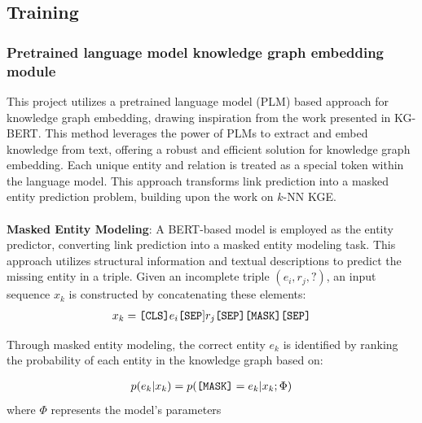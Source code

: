\subsection{Training}
\subsubsection{Pretrained language model knowledge graph embedding module}
This project utilizes a pretrained language model (PLM) based approach for knowledge graph embedding, drawing inspiration from the work presented in KG-BERT\cite{yao2019kg}. This method leverages the power of PLMs to extract and embed knowledge from text, offering a robust and efficient solution for knowledge graph embedding. Each unique entity and relation is treated as a special token within the language model. This approach transforms link prediction into a masked entity prediction problem, building upon the work on $k$-NN KGE\cite{10.1007/978-3-031-44693-1_9}.\\\\
\textbf{Masked Entity Modeling}: A BERT-based model is employed as the entity predictor, converting link prediction into a masked entity modeling task. This approach utilizes structural information and textual descriptions to predict the missing entity in a triple. Given an incomplete triple $(e_i, r_j, ?)$, an input sequence $x_k$ is constructed by concatenating these elements:
\begin{align*}
x_k = \text{\texttt{[CLS]}} e_i \text{\texttt{[SEP}]} r_j \text{\texttt{[SEP]}} \text{\texttt{[MASK]}} \text{\texttt{[SEP]}}
\end{align*}

Through masked entity modeling, the correct entity $e_k$ is identified by ranking the probability of each entity in the knowledge graph based on:

\begin{align}
p(e_k|x_k) = p(\text{\texttt{[MASK]}} = e_k|x_k;\Phi)
\end{align}
where $\Phi$ represents the model's parameters

